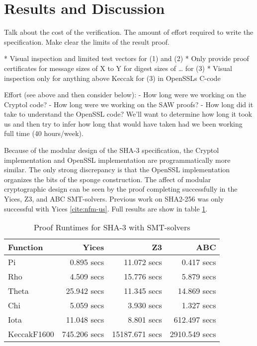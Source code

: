 \section{Results and Discussion}\label{sec:results}

Talk about the cost of the verification. The amount of effort required to write the specification. Make clear the limits of the result proof.

* Visual inspection and limited test vectors for (1) and (2)
* Only provide proof certificates for message sizes of X to Y for digest sizes of … for (3)
* Visual inspection only for anything above Keccak for (3) in OpenSSLs C-code

Effort (see above and then consider below):
 - How long were we working on the Cryptol code?
 - How long were we working on the SAW proofs?
 - How long did it take to understand the OpenSSL code?
We'll want to determine how long it took us and then try to infer how long that would have taken had we been working full time (40 hours/week).

Because of the modular design of the SHA-3 specification, the Cryptol implementation and OpenSSL implementation are programmatically more similar. 
The only strong discrepancy is that the OpenSSL implementation organizes the bits of the sponge construction. 
The affect of modular cryptographic design can be seen by the proof completing successfully in the Yices, Z3, and ABC SMT-solvers. 
Previous work on SHA2-256 was only successful with Yices \ref{cite:nfm-us}. Full results are show in table \ref{finaltable}. 

\begin{table}[b]
\caption{Proof Runtimes for SHA-3 with SMT-solvers}\label{finaltable}
\setlength{\tabcolsep}{13.5pt}
\begin{tabular}{|l|r|r|r|}
\hline
\textbf{Function} & \textbf{Yices} & \textbf{Z3} & \textbf{ABC} \\
\hline
Pi          &   0.895 secs &    11.072 secs &    0.417 secs \\
Rho         &   4.509 secs &    15.776 secs &    5.879 secs \\
Theta       &  25.942 secs &    11.345 secs &   14.869 secs \\
Chi         &   5.059 secs &     3.930 secs &    1.327 secs \\
Iota        &  11.048 secs &     8.801 secs &  612.497 secs \\
KeccakF1600 & 745.206 secs & 15187.671 secs & 2910.549 secs \\
\hline
\end{tabular}
\end{table}